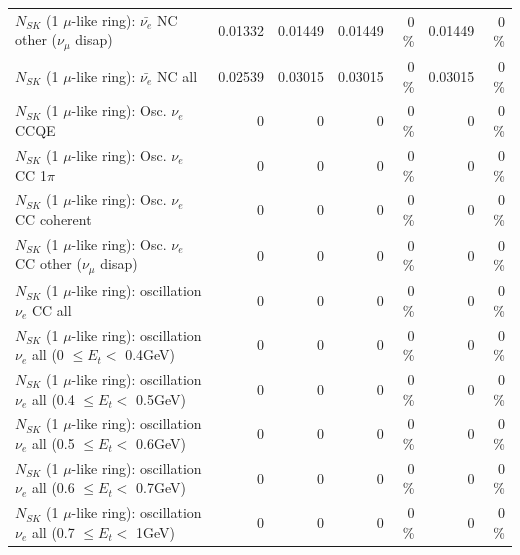 \begin{table}
\begin{tabular}{| l | r | r | r  r | r  r |}
          $N_{SK}$ (1 $\mu$-like ring): $\bar{\nu_e}$ NC other ($\nu_\mu$ disap) &         0.01332 &         0.01449 &         0.01449 &        0 \%  &         0.01449 &        0 \%  \\ 
                            $N_{SK}$ (1 $\mu$-like ring): $\bar{\nu_{e}}$ NC all &         0.02539 &         0.03015 &         0.03015 &        0 \%  &         0.03015 &        0 \%  \\ 
\hline
\hline
\hline
                                 $N_{SK}$ (1 $\mu$-like ring): Osc. $\nu_e$ CCQE &               0 &               0 &               0 &        0 \%  &               0 &        0 \%  \\ 
                            $N_{SK}$ (1 $\mu$-like ring): Osc. $\nu_e$ CC 1$\pi$ &               0 &               0 &               0 &        0 \%  &               0 &        0 \%  \\ 
                          $N_{SK}$ (1 $\mu$-like ring): Osc. $\nu_e$ CC coherent &               0 &               0 &               0 &        0 \%  &               0 &        0 \%  \\ 
           $N_{SK}$ (1 $\mu$-like ring): Osc. $\nu_e$ CC other ($\nu_\mu$ disap) &               0 &               0 &               0 &        0 \%  &               0 &        0 \%  \\ 
                        $N_{SK}$ (1 $\mu$-like ring): oscillation $\nu_e$ CC all &               0 &               0 &               0 &        0 \%  &               0 &        0 \%  \\ 
\hline
$N_{SK}$ (1 $\mu$-like ring): oscillation $\nu_{e}$ all (0 $\leq E_{t} <$ 0.4GeV) &               0 &               0 &               0 &        0 \%  &               0 &        0 \%  \\ 
$N_{SK}$ (1 $\mu$-like ring): oscillation $\nu_{e}$ all (0.4 $\leq E_{t} <$ 0.5GeV) &               0 &               0 &               0 &        0 \%  &               0 &        0 \%  \\ 
$N_{SK}$ (1 $\mu$-like ring): oscillation $\nu_{e}$ all (0.5 $\leq E_{t} <$ 0.6GeV) &               0 &               0 &               0 &        0 \%  &               0 &        0 \%  \\ 
$N_{SK}$ (1 $\mu$-like ring): oscillation $\nu_{e}$ all (0.6 $\leq E_{t} <$ 0.7GeV) &               0 &               0 &               0 &        0 \%  &               0 &        0 \%  \\ 
$N_{SK}$ (1 $\mu$-like ring): oscillation $\nu_{e}$ all (0.7 $\leq E_{t} <$ 1GeV) &               0 &               0 &               0 &        0 \%  &               0 &        0 \%  \\ 

\end{tabular}
\end{table}

